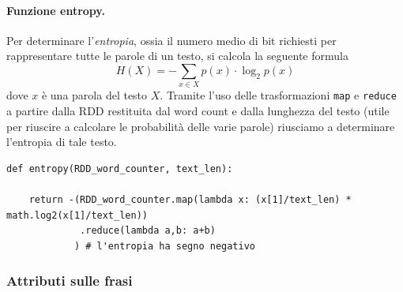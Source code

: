 \documentclass[titlepage]{article}
\begin{document}
\paragraph{Funzione entropy.}
Per determinare l'\textit{entropia}, ossia il numero medio di bit richiesti per rappresentare tutte le parole di un testo, si calcola la seguente formula
\[ H(X) = - \sum_{x \in X} p(x) \cdot \log_2 p(x) \]
dove $x$ è una parola del testo $X$. Tramite l'uso delle trasformazioni \texttt{map} e \texttt{reduce} a partire dalla RDD restituita dal word count e dalla lunghezza del testo (utile per riuscire a calcolare le probabilità delle varie parole) riusciamo a determinare l'entropia di tale testo.
\begin{verbatim}
def entropy(RDD_word_counter, text_len):

    return -(RDD_word_counter.map(lambda x: (x[1]/text_len) * math.log2(x[1]/text_len))
             .reduce(lambda a,b: a+b)
            ) # l'entropia ha segno negativo
\end{verbatim}

\subsubsection{Attributi sulle frasi}
\end{document}
